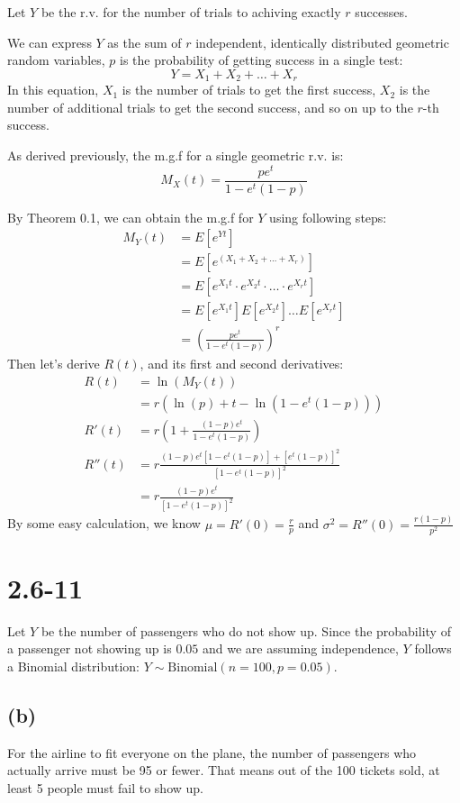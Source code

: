 \noindent\makebox[\linewidth]{\rule{\linewidth}{0.4pt}}

Let $Y$ be the r.v. for the number of trials to achiving exactly $r$ successes.

We can express $Y$ as the sum of $r$ independent, identically distributed geometric random variables, $p$ is the probability of getting success in a single test:
$$Y=X_1+X_2+\dots+X_r$$
In this equation, $X_1$ is the number of trials to get the first success, $X_2$ is the number of additional trials to get the second success, and so on up to the $r$-th success.

As derived previously, the m.g.f for a single geometric r.v. is:
$$M_X(t)=\frac{pe^t}{1-e^t(1-p)}$$

By Theorem 0.1, we can obtain the m.g.f for $Y$ using following steps:
\begin{align*}
M_Y(t)&=E[e^{Yt}] \\
&=E[e^{(X_1+X_2+\dots+X_r)}] \\
&=E[e^{X_1t}\cdot e^{X_2t}\cdot\dots\cdot e^{X_rt}] \\
&=E[e^{X_1t}]E[e^{X_2t}]\dots E[e^{X_rt}] \\
&=(\frac{pe^t}{1-e^t(1-p)})^r
\end{align*}
Then let's derive $R(t)$, and its first and second derivatives:
\begin{align*}
    R(t)&=\ln{(M_Y(t))} \\
    &=r(\ln{(p)}+t-\ln{(1-e^t(1-p))}) \\
    R'(t)&=r(1+\frac{(1-p)e^t}{1-e^t(1-p)}) \\
    R''(t)&=r\frac{(1-p)e^t[1-e^t(1-p)]+[e^t(1-p)]^2}{[1-e^t(1-p)]^2} \\
    &=r\frac{(1-p)e^t}{[1-e^t(1-p)]^2}
\end{align*}
By some easy calculation, we know $\mu=R'(0)=\frac{r}{p}$ and $\sigma^2=R''(0)=\frac{r(1-p)}{p^2}$
\section*{2.6-11}
Let $Y$ be the number of passengers who do not show up. Since the probability of a passenger not showing up is $0.05$ and we are assuming independence, $Y$ follows a Binomial distribution: $Y \sim \text{Binomial}(n=100, p=0.05)$.

\subsection*{(b)}
For the airline to fit everyone on the plane, the number of passengers who actually arrive must be 95 or fewer. That means out of the 100 tickets sold, at least 5 people must fail to show up. 

